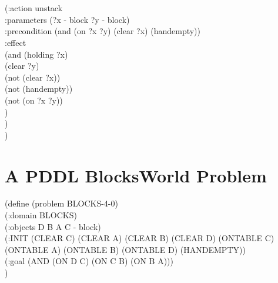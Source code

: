 \begin{appendix}
\\ \hspace*{1.5cm}		   
\\ \hspace*{1.5cm}  (:action unstack
\\ \hspace*{2cm}	     :parameters (?x - block ?y - block)
\\ \hspace*{2cm}	     :precondition (and (on ?x ?y) (clear ?x) (handempty))
\\ \hspace*{2cm}	     :effect
\\ \hspace*{2cm}	     (and (holding ?x)
\\ \hspace*{2.5cm}		   (clear ?y)
\\ \hspace*{2.5cm}		   (not (clear ?x))
\\ \hspace*{2.5cm}		   (not (handempty))
\\ \hspace*{2.5cm}		   (not (on ?x ?y))
\\ \hspace*{2cm})
\\ \hspace*{1.5cm})
\\ \hspace*{1cm})




\chapter{A PDDL BlocksWorld Problem}
\hspace*{1cm} (define (problem BLOCKS-4-0)
\\ \hspace*{1cm} (:domain BLOCKS)
\\ \hspace*{1cm} (:objects D B A C - block)
\\ \hspace*{1cm} (:INIT (CLEAR C) (CLEAR A) (CLEAR B) (CLEAR D) (ONTABLE C) \\ \hspace*{1cm} (ONTABLE A) (ONTABLE B) (ONTABLE D) (HANDEMPTY))
\\ \hspace*{1cm} (:goal (AND (ON D C) (ON C B) (ON B A)))
\\ \hspace*{1cm} )




\end{appendix}
